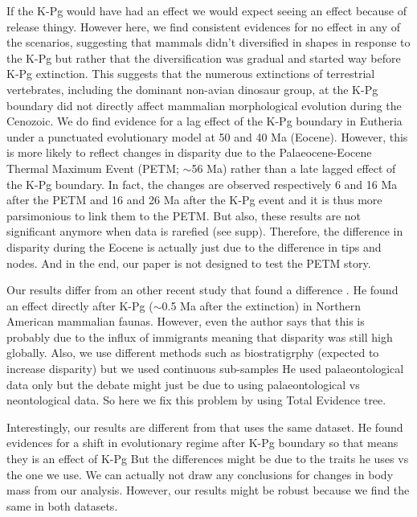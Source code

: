 \documentclass[12pt,letterpaper]{article}
\begin{document}
If the K-Pg would have had an effect we would expect seeing an effect because of release thingy.
However here, we find consistent evidences for no effect in any of the scenarios, suggesting that mammals didn't diversified in shapes in response to the K-Pg but rather that the diversification was gradual and started way before K-Pg extinction.
This suggests that the numerous extinctions of terrestrial vertebrates, including the dominant non-avian dinosaur group, at the K-Pg boundary did not directly affect mammalian morphological evolution during the Cenozoic.
We do find evidence for a lag effect of the K-Pg boundary in Eutheria under a punctuated evolutionary model at 50 and 40 Ma (Eocene).
However, this is more likely to reflect changes in disparity due to the Palaeocene-Eocene Thermal Maximum Event (PETM; $\sim$56 Ma) rather than a late lagged effect of the K-Pg boundary.
In fact, the changes are observed respectively 6 and 16 Ma after the PETM and 16 and 26 Ma after the K-Pg event and it is thus more parsimonious to link them to the PETM.
But also, these results are not significant anymore when data is rarefied (see supp).
Therefore, the difference in disparity during the Eocene is actually just due to the difference in tips and nodes.
And in the end, our paper is not designed to test the PETM story.

Our results differ from an other recent study that found a difference \citep{Wilson2013}.
He found an effect directly after K-Pg ($\sim$0.5 Ma after the extinction) in Northern American mammalian faunas.
However, even the author says that this is probably due to the influx of immigrants meaning that disparity was still high globally.
Also, we use different methods such as biostratigrphy (expected to increase disparity) but we used continuous sub-samples
He used palaeontological data only but the debate might just be due to using palaeontological vs neontological data.
So here we fix this problem by using Total Evidence tree.

Interestingly, our results are different from \cite{Slater2012MEE} that uses the same dataset.
He found evidences for a shift in evolutionary regime after K-Pg boundary so that means they is an effect of K-Pg
But the differences might be due to the traits he uses vs the one we use.
We can actually not draw any conclusions for changes in body mass from our analysis.
However, our results might be robust because we find the same in both datasets.
\end{document}
